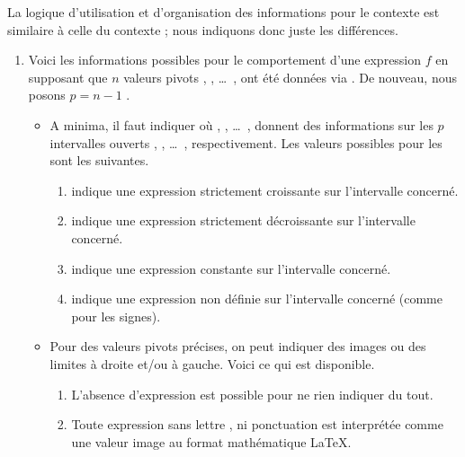 \documentclass[10pt, a4paper]{article}
\begin{document}
La logique d'utilisation et d'organisation des informations pour le contexte  est similaire à celle du contexte  ; nous indiquons donc juste les différences.
%
\begin{enumerate}
    \item Voici les informations possibles pour le comportement d'une expression $f$ en supposant que $n$ valeurs pivots  ,  , \dots\ ,  ont été données via  . De nouveau, nous posons $p = n - 1$ .
    \begin{itemize}
        \item A minima, il faut indiquer
        où
         ,  , \dots\ , 
        donnent des informations sur les $p$ intervalles ouverts
        \tdoclatexin{]x_1 ; x_2[} , \tdoclatexin{]x_2 ; x_3[} , \dots\ , \tdoclatexin{]x_p ; x_n[} respectivement.
        Les valeurs possibles pour les  sont les suivantes.
        \begin{enumerate}
            \item \tdoclatexin{<} indique une expression strictement croissante sur l'intervalle concerné.

            \item \tdoclatexin{>} indique une expression strictement décroissante sur l'intervalle concerné.

            \item \tdoclatexin{=} indique une expression constante sur l'intervalle concerné.

            \item {} indique une expression non définie sur l'intervalle concerné (comme pour les signes).
        \end{enumerate}


        \item Pour des valeurs pivots précises, on peut indiquer des images ou des limites à droite et/ou à gauche. Voici ce qui est disponible.
        \begin{enumerate}
            \item L'absence d'expression est possible pour ne rien indiquer du tout.

            \item Toute expression sans lettre , ni ponctuation \tdoclatexin{!} est interprétée comme une valeur image au format mathématique \LaTeX.


\end{enumerate}
\end{itemize}
\end{enumerate}
\end{document}

